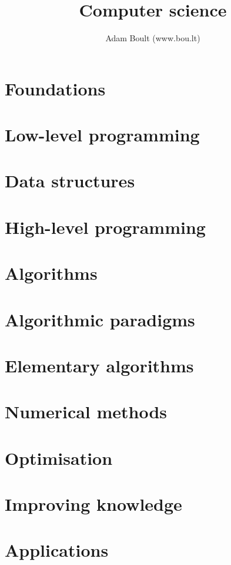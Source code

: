 \documentclass[oneside]{book}
\begin{document}
\author{Adam Boult (www.bou.lt)}
\title{Computer science}
\maketitle

\setcounter{tocdepth}{1}
\tableofcontents



\part{Foundations}





\part{Low-level programming}


\part{Data structures}







\part{High-level programming}




\part{Algorithms}



\part{Algorithmic paradigms}





\part{Elementary algorithms}





\part{Numerical methods}





\part{Optimisation}



\part{Improving knowledge}



\part{Applications}


\end{document}
